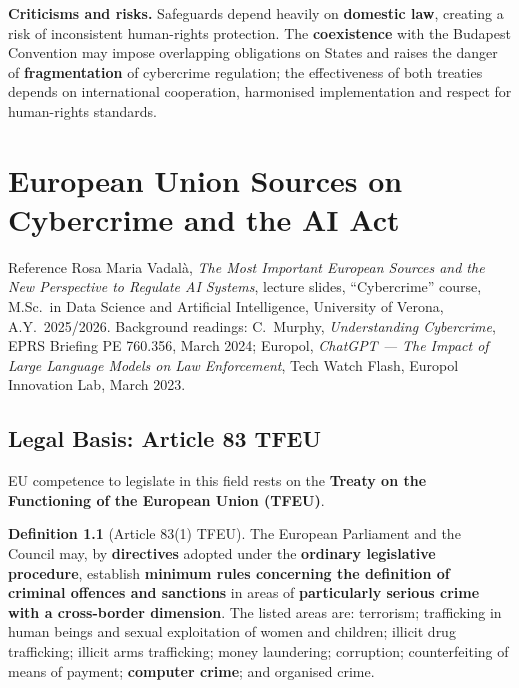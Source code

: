 \documentclass[11pt,a4paper,openany]{report}
\theoremstyle{definition}
\newtheorem{definition}{Definition}[chapter]
\theoremstyle{plain}
\theoremstyle{remark}
\begin{document}
\begin{actionbox}
\textbf{Criticisms and risks.} Safeguards depend heavily on \textbf{domestic law}, creating a risk of inconsistent human-rights protection. The \textbf{coexistence} with the Budapest Convention may impose overlapping obligations on States and raises the danger of \textbf{fragmentation} of cybercrime regulation; the effectiveness of both treaties depends on international cooperation, harmonised implementation and respect for human-rights standards.
\end{actionbox}

\chapter{European Union Sources on Cybercrime and the AI Act}
\label{chap:eu-sources}

\begin{sourcebox}{Reference}
Rosa Maria Vadal\`a, \textit{The Most Important European Sources and the New Perspective to Regulate AI Systems}, lecture slides, ``Cybercrime'' course, M.Sc.\ in Data Science and Artificial Intelligence, University of Verona, A.Y.\ 2025/2026. Background readings: C.\ Murphy, \textit{Understanding Cybercrime}, EPRS Briefing PE 760.356, March 2024; Europol, \textit{ChatGPT --- The Impact of Large Language Models on Law Enforcement}, Tech Watch Flash, Europol Innovation Lab, March 2023.
\end{sourcebox}

\section{Legal Basis: Article 83 TFEU}

EU competence to legislate in this field rests on the \textbf{Treaty on the Functioning of the European Union (TFEU)}.

\begin{definition}[Article 83(1) TFEU]
The European Parliament and the Council may, by \textbf{directives} adopted under the \textbf{ordinary legislative procedure}, establish \textbf{minimum rules concerning the definition of criminal offences and sanctions} in areas of \textbf{particularly serious crime with a cross-border dimension}. The listed areas are: terrorism; trafficking in human beings and sexual exploitation of women and children; illicit drug trafficking; illicit arms trafficking; money laundering; corruption; counterfeiting of means of payment; \textbf{computer crime}; and organised crime.
\end{definition}
\end{document}
